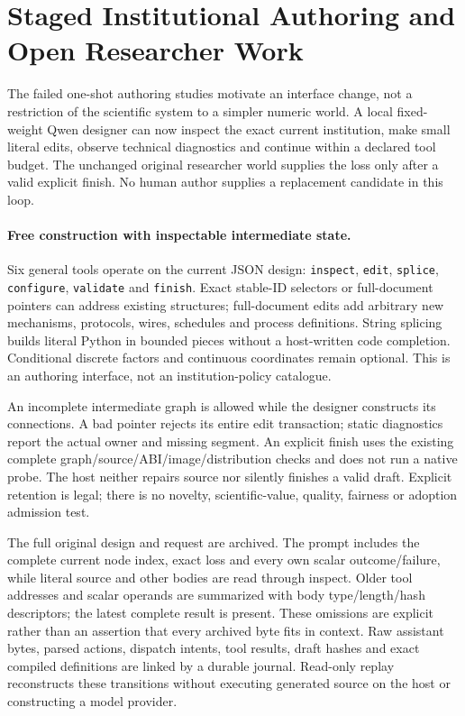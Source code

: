 \section{Staged Institutional Authoring and Open Researcher Work}
\label{sec:staged-authoring-v15}

The failed one-shot authoring studies motivate an interface change, not a
restriction of the scientific system to a simpler numeric world. A local
fixed-weight Qwen designer can now inspect the exact current institution,
make small literal edits, observe technical diagnostics and continue within
a declared tool budget. The unchanged original researcher world supplies
the loss only after a valid explicit finish. No human author supplies a
replacement candidate in this loop.

\paragraph{Free construction with inspectable intermediate state.}
Six general tools operate on the current JSON design: \texttt{inspect},
\texttt{edit}, \texttt{splice}, \texttt{configure}, \texttt{validate} and
\texttt{finish}. Exact stable-ID selectors or full-document pointers can
address existing structures; full-document edits add arbitrary new mechanisms,
protocols, wires, schedules and process definitions. String splicing builds
literal Python in bounded pieces without a host-written code completion.
Conditional discrete factors and continuous coordinates remain optional.
This is an authoring interface, not an institution-policy catalogue.

An incomplete intermediate graph is allowed while the designer constructs
its connections. A bad pointer rejects its entire edit transaction; static
diagnostics report the actual owner and missing segment. An explicit finish
uses the existing complete graph/source/ABI/image/distribution checks and
does not run a native probe. The host neither repairs source nor silently
finishes a valid draft. Explicit retention is legal; there is no novelty,
scientific-value, quality, fairness or adoption admission test.

The full original design and request are archived. The prompt includes the
complete current node index, exact loss and every own scalar outcome/failure,
while literal source and other bodies are read through inspect. Older tool
addresses and scalar operands are summarized with body type/length/hash
descriptors; the latest complete result is present. These omissions are
explicit rather than an assertion that every archived byte fits in context.
Raw assistant bytes, parsed actions, dispatch intents, tool results, draft
hashes and exact compiled definitions are linked by a durable journal.
Read-only replay reconstructs these transitions without executing generated
source on the host or constructing a model provider.

